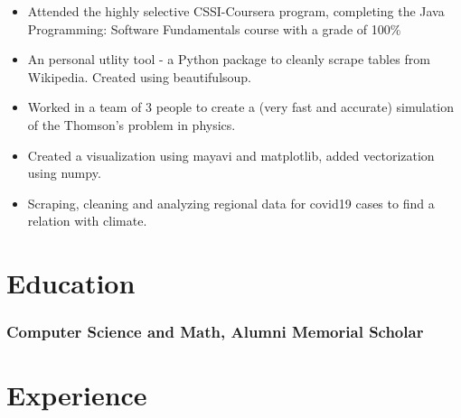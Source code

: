 \documentclass[a4paper]{resume}
\begin{document}
\begin{itemize} \vspace{-5pt} \itemsep -2pt
	\item Attended the highly selective CSSI-Coursera program, completing the Java Programming: Software Fundamentals course with a grade of 100\%
\end{itemize}

\enresection



\begin{itemize} \vspace{-5pt} \itemsep -2pt
	\item An personal utlity tool - a Python package to cleanly scrape tables from Wikipedia. Created using beautifulsoup.
\end{itemize}

\begin{itemize} \vspace{-5pt} \itemsep -2pt
	\item Worked in a team of 3 people to create a (very fast and accurate) simulation of the Thomson's problem in physics.
	\item Created a visualization using mayavi and matplotlib, added vectorization using numpy.
\end{itemize}

\begin{itemize} \vspace{-5pt} \itemsep -2pt
	\item Scraping, cleaning and analyzing regional data for covid19 cases to find a relation with climate.
\end{itemize}

\enresection



\section{Education}
\subsubsection{Computer Science and Math, Alumni Memorial Scholar}

\section{Experience}
\end{document}

